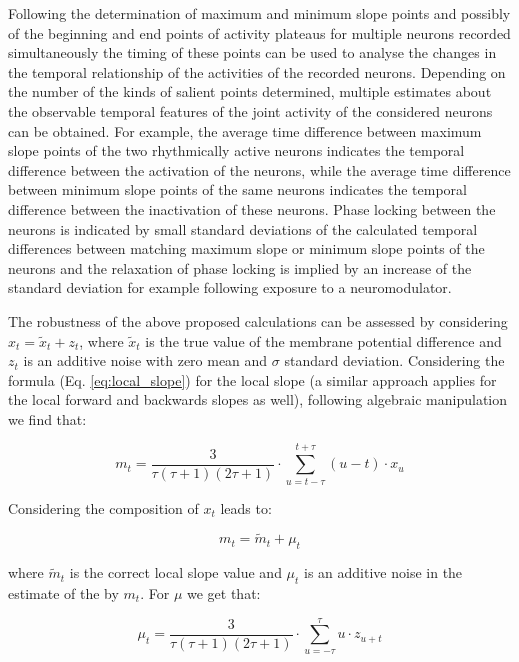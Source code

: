 Following the determination of maximum and minimum slope points and possibly of the beginning and end points of activity plateaus for multiple neurons recorded simultaneously the timing of these points can be used to analyse the changes in the temporal relationship of the activities of the recorded neurons. Depending on the number of the kinds of salient points determined, multiple estimates about the observable temporal features of the joint activity of the considered neurons can be obtained. For example, the average time difference between maximum slope points of the two rhythmically active neurons indicates the temporal difference between the activation of the neurons, while the average time difference between minimum slope points of the same neurons indicates the temporal difference between the inactivation of these neurons. Phase locking between the neurons is indicated by small standard deviations of  the calculated temporal differences between matching maximum slope or minimum slope points of the neurons and the relaxation of phase locking is implied by an increase of the standard deviation for example following exposure to a neuromodulator.

The robustness of the above proposed calculations can be assessed by considering $x_{t} = \tilde{x}_{t}+z_{t}$, where $\tilde{x}_{t}$ is the true value of the membrane potential difference and $z_{t}$ is an additive noise with zero mean and $\sigma$ standard deviation. Considering the formula (Eq. \ref{eq:local_slope}) for the local slope (a similar approach applies for the local forward and backwards slopes as well), following algebraic manipulation we find that:

\begin{equation}
\label{eq:ten}
m_{t}=\frac{3}{\tau(\tau+1)(2\tau + 1)}\cdot \sum_{u=t-\tau}^{t+\tau}(u-t) \cdot x_{u}
\end{equation}

Considering the composition of $x_{t}$ leads to:

\begin{equation}
\label{eq:eleven}
m_{t} = \tilde{m}_{t} + \mu_{t}
\end{equation}

where $\tilde{m}_{t}$ is the correct local slope value and $\mu_{t}$ is an additive noise in the estimate of the by $m_{t}$. For $\mu$ we get that:

\begin{equation}
\label{eq:twelve}
\mu_{t} = \frac{3}{\tau(\tau + 1)(2\tau + 1)}\cdot \sum_{u=-\tau}^{\tau}u \cdot z_{u+t}
\end{equation}

